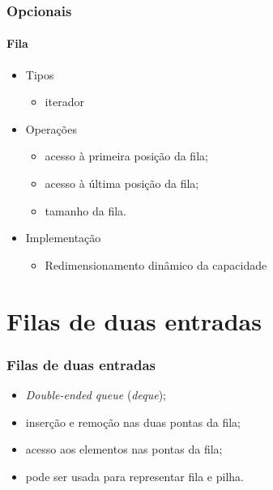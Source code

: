 \documentclass{beamer}
\begin{document}
\begin{frame}
  \frametitle{Opcionais}
  \framesubtitle{Fila}

  \begin{itemize}
    \item Tipos
      \begin{itemize}
        \item iterador
      \end{itemize}
    \item Operações
      \begin{itemize}
        \item acesso à primeira posição da fila;
        \item acesso à última posição da fila;
        \item tamanho da fila.
      \end{itemize}
    \item Implementação
      \begin{itemize}
        \item Redimensionamento dinâmico da capacidade
      \end{itemize}
  \end{itemize}
\end{frame}

\section{Filas de duas entradas}

\begin{frame}
  \frametitle{Filas de duas entradas}

  \begin{itemize}

    \item \textit{Double-ended queue\/} (\textit{deque\/});
     
    \item inserção e remoção nas duas pontas da fila;

    \item acesso aos elementos nas pontas da fila;

    \item pode ser usada para representar fila e pilha.

  \end{itemize}
\end{frame}
\end{document}
